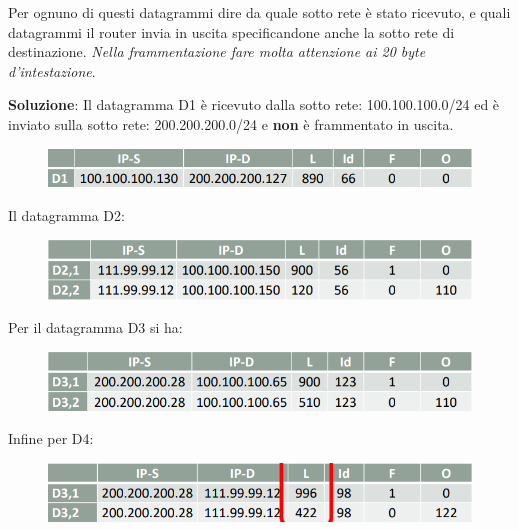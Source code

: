 \documentclass[11pt,a4paper,oneside]{book}
\theoremstyle{definition}
\begin{document}
\begin{enumerate}
	      Per ognuno di questi datagrammi dire da quale sotto rete è stato ricevuto, e
	      quali datagrammi il router invia in uscita specificandone anche la sotto rete di
	      destinazione. \textit{Nella frammentazione fare molta attenzione ai 20 byte d'intestazione}.


	      \textbf{Soluzione}:
	      Il datagramma D1 è ricevuto dalla sotto rete: 100.100.100.0/24 ed è inviato sulla sotto rete: 200.200.200.0/24 e \textbf{non} è frammentato in uscita.

	      \begin{figure}[!h]
		      \includegraphics[scale=0.4]{Immagini/Ip_es2_1.png}
		      \centering
	      \end{figure}

	      Il datagramma D2:

	      \begin{figure}[!h]
		      \includegraphics[scale=0.4]{Immagini/Ip_es2_2.png}
		      \centering
	      \end{figure}

	      Per il datagramma D3 si ha:

	      \begin{figure}[!h]
		      \includegraphics[scale=0.4]{Immagini/Ip_es2_3.png}
		      \centering
	      \end{figure}

	      Infine per D4:

	      \begin{figure}[!h]
		      \includegraphics[scale=0.4]{Immagini/Ip_es2_4.png}
		      \centering
	      \end{figure}


\end{enumerate}
\end{document}

